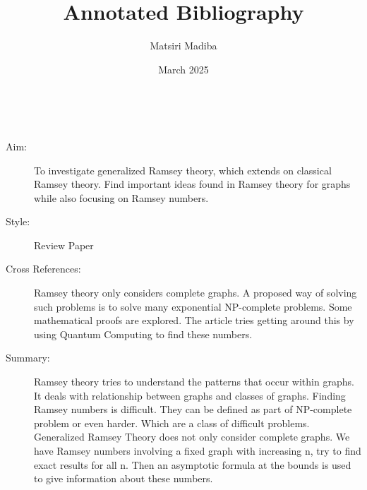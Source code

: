 \documentclass{Assignment}
\author{Matsiri Madiba}
\date{March 2025}
\title{Annotated Bibliography}
\begin{document}
\maketitle
\cite{burr1981generalized}~
\begin{description}
	\item[Aim:]
	To investigate generalized Ramsey theory, which extends on classical Ramsey theory.
	Find important ideas found in Ramsey theory for graphs while also focusing on Ramsey numbers.

\item[Style:]
Review Paper
\item[Cross References:]
Ramsey theory only considers complete graphs. 
A proposed way of solving such problems is to solve many exponential NP-complete problems.
Some mathematical proofs are explored.
The article \cite{PhysRevA.93.032301} tries getting around this by using Quantum Computing to find these numbers.
\item [Summary:]
Ramsey theory tries to understand the patterns that occur within graphs.
It deals with relationship between graphs and classes of graphs.
Finding Ramsey numbers is difficult.
They can be defined as part of NP-complete problem or even harder.
Which are a class of difficult problems.
Generalized Ramsey Theory does not only consider complete graphs.
We have Ramsey numbers involving a fixed graph with increasing n, try to find exact results for all n. 
Then an asymptotic formula at the bounds is used to give information about these numbers.  
\end{description}
\end{document}
